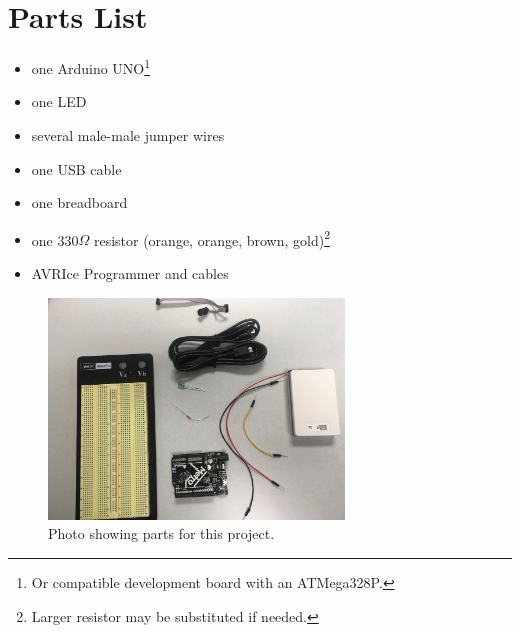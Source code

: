 \documentclass{article}
\begin{document}
\tableofcontents

\section{Parts List}

\begin{multicols}{2}

\begin{itemize}

\item one Arduino UNO\footnote{Or compatible development board with an ATMega328P.}

\item one LED

\item several male-male jumper wires

\item one USB cable

\item one breadboard

\item one 330$\Omega$ resistor (orange, orange, brown, gold)\footnote{Larger
	resistor may be substituted if needed.}

\item AVRIce Programmer and cables

\end{itemize}

\end{multicols}

\begin{figure}[H]
	\centering

	\includegraphics[max width = 0.7\textwidth]{parts.jpg}

	\caption{Photo showing parts for this project.}

\end{figure}
\end{document}
